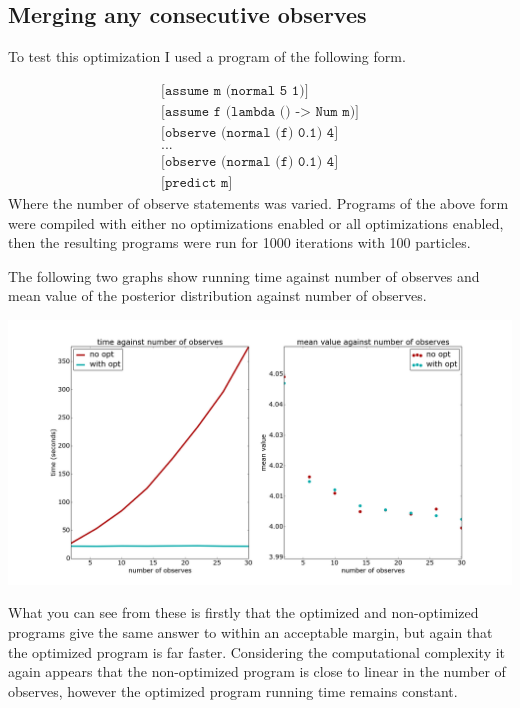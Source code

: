 \documentclass[a4paper]{article}
\begin{document}

\subsection{Merging any consecutive observes}

To test this optimization I used a program of the following form.

\[
	\begin{array}{l}
		\texttt{[assume m (normal 5 1)]} \\
		\texttt{[assume f (lambda () -> Num m)]} \\
		\texttt{[observe (normal (f) 0.1) 4]} \\
		\texttt{...} \\
		\texttt{[observe (normal (f) 0.1) 4]} \\
		\texttt{[predict m]}
	\end{array}
\]
Where the number of observe statements was varied. Programs of the above form were compiled with either no optimizations enabled or all optimizations enabled, then the resulting programs were run for 1000 iterations with 100 particles.

The following two graphs show running time against number of observes and mean value of the posterior distribution against number of observes.

\centerline{\includegraphics[width=16cm]{images/merging_consecutive_observes_1.png}}

What you can see from these is firstly that the optimized and non-optimized programs give the same answer to within an acceptable margin, but again that the optimized program is far faster. Considering the computational complexity it again appears that the non-optimized program is close to linear in the number of observes, however the optimized program running time remains constant.
\end{document}
